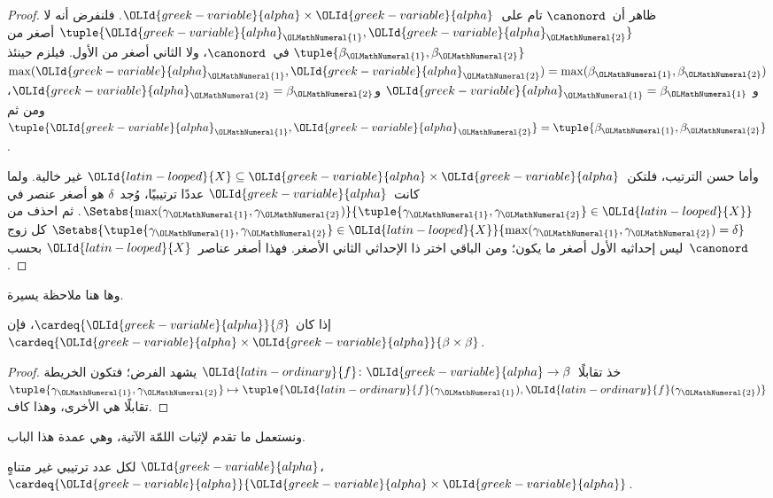 \documentclass[../../../include/open-logic-section]{subfiles}
\begin{document}
\begin{proof}
ظاهر أن~$\canonord$ تام على~$\OLId{greek-variable}{alpha} \times \OLId{greek-variable}{alpha}$. فلنفرض أنه لا
$\tuple{\OLId{greek-variable}{alpha}_\OLMathNumeral{1}, \OLId{greek-variable}{alpha}_\OLMathNumeral{2}}$ أصغر من
$\tuple{\beta_\OLMathNumeral{1}, \beta_\OLMathNumeral{2}}$ في~$\canonord$، ولا الثاني أصغر من الأول.
فيلزم حينئذ
$\max(\OLId{greek-variable}{alpha}_\OLMathNumeral{1}, \OLId{greek-variable}{alpha}_\OLMathNumeral{2}) = \max(\beta_\OLMathNumeral{1}, \beta_\OLMathNumeral{2})$ و
$\OLId{greek-variable}{alpha}_\OLMathNumeral{1} = \beta_\OLMathNumeral{1}$ و$\OLId{greek-variable}{alpha}_\OLMathNumeral{2} = \beta_\OLMathNumeral{2}$، ومن ثم
$\tuple{\OLId{greek-variable}{alpha}_\OLMathNumeral{1}, \OLId{greek-variable}{alpha}_\OLMathNumeral{2}} = \tuple{\beta_\OLMathNumeral{1}, \beta_\OLMathNumeral{2}}$.

وأما حسن الترتيب، فلتكن~$\OLId{latin-looped}{X} \subseteq \OLId{greek-variable}{alpha}\times\OLId{greek-variable}{alpha}$ غير
خالية. ولما كانت~$\OLId{greek-variable}{alpha}$ عددًا ترتيبيًا، وُجد~$\delta$ هو أصغر عنصر في
$\Setabs{\max(\gamma_\OLMathNumeral{1}, \gamma_\OLMathNumeral{2})}{\tuple{\gamma_\OLMathNumeral{1},
\gamma_\OLMathNumeral{2}} \in \OLId{latin-looped}{X}}$. ثم احذف من
$\Setabs{\tuple{\gamma_\OLMathNumeral{1},\gamma_\OLMathNumeral{2}} \in \OLId{latin-looped}{X}}{\max(\gamma_\OLMathNumeral{1}, \gamma_\OLMathNumeral{2}) =
\delta}$ كل زوج ليس إحداثيه الأول أصغر ما يكون؛ ومن الباقي اختر ذا
الإحداثي الثاني الأصغر. فهذا أصغر عناصر~$\OLId{latin-looped}{X}$ بحسب~$\canonord$.
\end{proof}
\noindent
وها هنا ملاحظة يسيرة.

\begin{prop}
إذا كان $\cardeq{\OLId{greek-variable}{alpha}}{\beta}$، فإن
$\cardeq{\OLId{greek-variable}{alpha} \times \OLId{greek-variable}{alpha}}{\beta \times \beta}$.
\end{prop}

\begin{proof}
خذ تقابلًا~$\OLId{latin-ordinary}{f} \colon \OLId{greek-variable}{alpha} \to \beta$ يشهد الفرض؛
فتكون الخريطة
$\tuple{\gamma_\OLMathNumeral{1}, \gamma_\OLMathNumeral{2}} \mapsto
\tuple{\OLId{latin-ordinary}{f}(\gamma_\OLMathNumeral{1}), \OLId{latin-ordinary}{f}(\gamma_\OLMathNumeral{2})}$ تقابلًا هي الأخرى، وهذا كاف.
\end{proof}
\noindent
ونستعمل ما تقدم لإثبات اللمّة الآتية، وهي عمدة هذا الباب.
\begin{lem}
لكل عدد ترتيبي غير متناهٍ $\OLId{greek-variable}{alpha}$،
$\cardeq{\OLId{greek-variable}{alpha}}{\OLId{greek-variable}{alpha} \times \OLId{greek-variable}{alpha}}$.
\end{lem}
\end{document}
